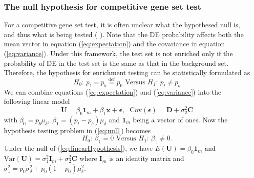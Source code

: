 \documentclass[11pt, a4paper]{article}
\begin{document}
	\subsubsection*{The null hypothesis for competitive gene set test}\label{subsubsection:nullhypothesis}
	For a competitive gene set test, it is often unclear what the hypothesed null is, and thus what is being tested (\cite{barry2008statistical}  \citealp{wu2012camera}). Note that the DE probability affects both the mean vector in equation (\ref{eq:expectation}) and the covariance in equation (\ref{eq:variance}). Under this framework, the test set is not enriched only if the probability of DE in the test set is the same as that in the background set. Therefore, the hypothesis for enrichment testing can be statistically formulated as
	\begin{equation}\label{eq:null}
		H_0\text{: }  p_t = p_b \stackrel{\text{def}}{=}p_0  \text{ Versus } H_1 \text{: } p_t \neq p_b
	\end{equation}
	We can combine equations (\ref{eq:expectation}) and (\ref{eq:variance}) into the following linear model
	\begin{equation}\label{eq:linearModel}
		\bm U = \beta_0\bm 1_m + \beta_1\bm x + \bm \epsilon, \text{~~Cov}(\bm \epsilon) =  \bm D  + \sigma_2^2\bm C
	\end{equation} 
	with $ \beta_0 = p_b\mu_{\delta}, ~\beta_1 = (p_t-p_b)\mu_{\delta}$ and $\bm 1_m$ being a vector of ones. Now the hypothesis testing problem in (\ref{eq:null}) becomes 
	\begin{equation}\label{eq:linearHypothesis}
		H_0\text{: }  \beta_1 = 0   \text{ Versus } H_1 \text{: } \beta_1 \neq 0.
	\end{equation}
	Under the null of (\ref{eq:linearHypothesis}), we have $E(\bm U) = \beta_0\bm 1_m$ and $\text{Var}(\bm U) = \sigma^2_1\bm I_m + \sigma_2^2 \bm C$ where $\bm I_m$ is an identity matrix and $\sigma_1^2 = p_0\sigma^2_{\delta}+ p_0(1-p_0)\mu^2_{\delta}$.
	
\end{document}

